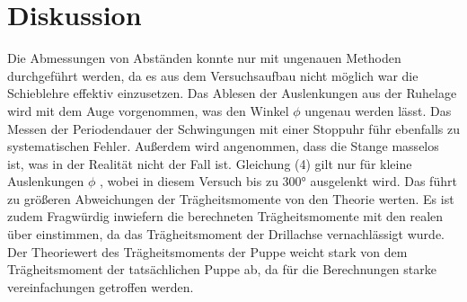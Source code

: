 \section{Diskussion}
\label{sec:Diskussion}
Die Abmessungen von Abständen konnte nur mit ungenauen Methoden durchgeführt werden,
da es aus dem Versuchsaufbau nicht möglich war die Schieblehre effektiv einzusetzen.
Das Ablesen der Auslenkungen aus der Ruhelage wird mit dem Auge vorgenommen, was
den Winkel $\phi$ ungenau werden lässt. Das Messen der Periodendauer der
Schwingungen mit einer Stoppuhr führ ebenfalls zu systematischen Fehler.
Außerdem wird angenommen, dass die Stange masselos ist, was in der Realität
nicht der Fall ist. Gleichung (4) gilt nur für kleine Auslenkungen $\phi$ , wobei
in diesem Versuch bis zu 300° ausgelenkt wird. Das führt zu größeren Abweichungen
der Trägheitsmomente von den Theorie werten. Es ist zudem Fragwürdig inwiefern die
berechneten Trägheitsmomente mit den realen über einstimmen, da das Trägheitsmoment
der Drillachse vernachlässigt wurde.
Der Theoriewert des Trägheitsmoments
der Puppe weicht stark von dem Trägheitsmoment der tatsächlichen Puppe ab, da für die
Berechnungen starke vereinfachungen getroffen werden.
